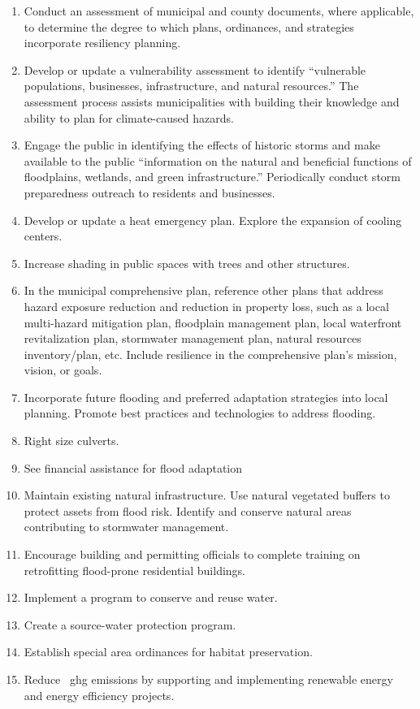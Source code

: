 \begin{enumerate}
    \item Conduct an assessment of municipal and county documents, where 
applicable, to determine the degree to which plans, ordinances, and strategies 
incorporate resiliency planning.
    \item Develop or update a vulnerability assessment to identify ``vulnerable 
    populations, businesses, infrastructure, and natural resources.'' The 
    assessment process assists municipalities with building their knowledge and 
    ability to plan for climate-caused hazards.
    \item Engage the public in identifying the effects of historic storms 
    and make available to the public ``information on the natural and 
    beneficial 
    functions of floodplains, wetlands, and green infrastructure.'' 
    Periodically conduct storm preparedness outreach to residents and 
    businesses.
    \item Develop or update a heat emergency plan. Explore the expansion of 
    cooling centers.
    \item Increase shading in public spaces with trees and other structures.
    \item In the municipal comprehensive plan, reference other plans that 
    address hazard exposure reduction and reduction in property loss, such as a 
    local multi-hazard mitigation plan, floodplain management plan, local 
    waterfront revitalization plan, stormwater management plan, natural 
    resources inventory/plan, etc. Include resilience in the comprehensive 
    plan's mission, vision, or goals.
    \item Incorporate future flooding and preferred adaptation strategies into 
    local planning. Promote best practices and technologies to address flooding.
    \item Right size culverts.
    \item See financial assistance for flood adaptation
    \item Maintain existing natural infrastructure. Use natural vegetated 
    buffers to protect assets from flood risk. Identify and conserve natural 
    areas contributing to stormwater management. 
    \item Encourage building and permitting officials to complete training on 
    retrofitting flood-prone residential buildings.
    \item Implement a program to conserve and reuse water.
    \item Create a source-water protection program.
    \item Establish special area ordinances for habitat preservation. 
    \item Reduce ~\gls{ghg} emissions by supporting and implementing renewable 
    energy and energy efficiency projects.
\end{enumerate}
\nocite{climateexplorer}
\nocite{climatesmart}
\nocite{climateimpactshealth}
\nocite{nysag2014}
\nocite{mhredcstrategic}
\nocite{cscresiliency2014}
\nocite{ocnysenvironmental}
\nocite{degaetano2011}